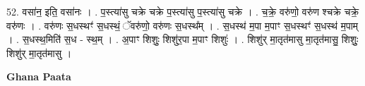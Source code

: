 \documentclass[17pt]{extarticle}
\begin{document}
52. वसा॑न॒ इति॒ वसा॑नः । . प॒स्त्या॑सु चक्रे चक्रे प॒स्त्या॑सु प॒स्त्या॑सु चक्रे । . च॒क्रे॒ वरु॑णो॒ वरु॑ण श्चक्रे चक्रे॒ वरु॑णः । . वरु॑णः स॒धस्थꣳ॑ स॒धस्थं॒ ॅवरु॑णो॒ वरु॑णः स॒धस्थ᳚म् । . स॒धस्थ॑ म॒पा म॒पाꣳ स॒धस्थꣳ॑ स॒धस्थ॑ म॒पाम् । . स॒धस्थ॒मिति॑ स॒ध - स्थ॒म् । . अ॒पाꣳ शिशुः॒ शिशु॑र॒पा म॒पाꣳ शिशुः॑ । . शिशु॑र् मा॒तृत॑मासु मा॒तृत॑मासु॒ शिशुः॒ शिशु॑र् मा॒तृत॑मासु । \newline

\textbf{Ghana Paata } \newline
\end{document}
